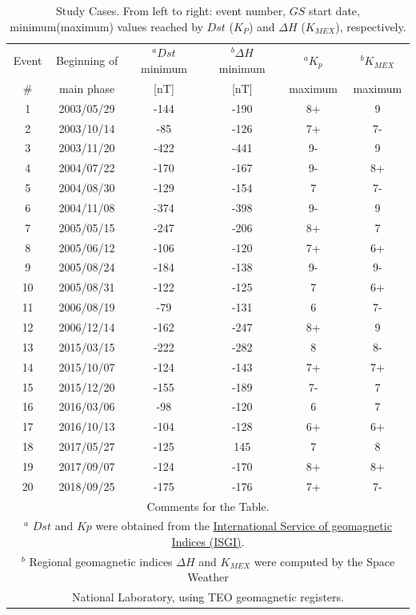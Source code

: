 \documentclass[a4paper,fleqn]{cas-dc}
\begin{document}
\begin{table}[h!]
\normalsize
\centering
    \caption{Study Cases. From left to right: event number, $GS$ start date, minimum(maximum) values reached by ${Dst}$ (${K_P}$) and ${ \Delta H}$ (${K_{MEX}}$), respectively.}
    \label{table1:GS_descp}
\begin{tabular}{cccccc}
\toprule
Event & Beginning of & $^a {Dst}$ minimum
 & $^b{\Delta H}$ minimum
 & $^a{K_p}$ & $^b {K_{MEX}}$ \\
\#    & main phase & [nT] & [nT] & maximum & maximum\\
\midrule
1 & 2003/05/29 & -144 & -190 & 8+ & 9 \\ 
2 & 2003/10/14 & -85 & -126 & 7+ & 7- \\ 
3 & 2003/11/20 & -422 & -441 & 9- & 9 \\ 
4 & 2004/07/22 & -170 & -167 & 9- & 8+ \\ 
5 & 2004/08/30 & -129 & -154 & 7 & 7- \\ 
6 & 2004/11/08 & -374 & -398 & 9- & 9 \\ 
7 & 2005/05/15 & -247 & -206 & 8+ & 7 \\ 
8 & 2005/06/12 & -106 & -120 & 7+ & 6+ \\ 
9 & 2005/08/24 & -184 & -138 & 9- & 9- \\ 
10 & 2005/08/31 & -122 & -125 & 7 & 6+ \\ 
11 & 2006/08/19 & -79 & -131 & 6 & 7- \\ 
12 & 2006/12/14 & -162 & -247 & 8+ & 9 \\ 
13 & 2015/03/15 & -222 & -282 & 8 & 8- \\ 
14 & 2015/10/07 & -124 & -143 & 7+ & 7+ \\ 
15 & 2015/12/20 & -155 & -189 & 7- & 7 \\ 
16 & 2016/03/06 & -98 & -120 & 6 & 7 \\ 
17 & 2016/10/13 & -104 & -128 & 6+ & 6+ \\ 
18 & 2017/05/27 & -125 & 145 & 7 & 8 \\ 
19 & 2017/09/07 & -124 & -170 & 8+ & 8+ \\ 
20 & 2018/09/25 & -175 & -176 & 7+ & 7- \\ 
\bottomrule
\multicolumn{6}{L}{Comments for the Table.} \\
\multicolumn{6}{L}{$^a$ $Dst$ and $Kp$ were obtained from the \href{http://isgi.unistra.fr/data_download.php}{International Service of geomagnetic Indices (ISGI)}.}\\
\multicolumn{6}{L}{$^b$ Regional geomagnetic indices ${\Delta H}$ and ${K_{MEX}}$ were computed by the Space Weather} \\
\multicolumn{6}{L}{National Laboratory, using TEO geomagnetic registers.}    \end{tabular}
\end{table}
\end{document}
